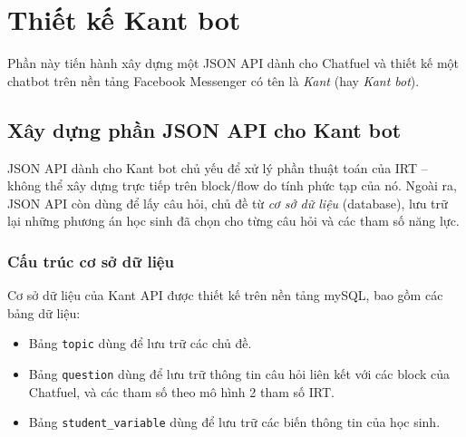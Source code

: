 \section{Thiết kế Kant bot}
Phần này tiến hành xây dựng một JSON API dành cho Chatfuel và thiết kế một chatbot trên nền tảng Facebook Messenger có tên là \textit{Kant} (hay \textit{Kant bot}).

\subsection{Xây dựng phần JSON API cho Kant bot}
JSON API dành cho Kant bot chủ yếu để xử lý phần thuật toán của IRT – không thể xây dựng trực tiếp trên block/flow do tính phức tạp của nó. Ngoài ra, JSON API còn dùng để lấy câu hỏi, chủ đề từ \textit{cơ sở dữ liệu} (database), lưu trữ lại những phương án học sinh đã chọn cho từng câu hỏi và các tham số năng lực.

\subsubsection{Cấu trúc cơ sở dữ liệu}
Cơ sở dữ liệu của Kant API được thiết kế trên nền tảng mySQL, bao gồm các bảng dữ liệu: \begin{itemize}
	\item Bảng \texttt{topic} dùng để lưu trữ các chủ đề.
	\item Bảng \texttt{question} dùng để lưu trữ thông tin câu hỏi liên kết với các block của Chatfuel, và các tham số theo mô hình 2 tham số IRT.
	\item Bảng \texttt{student\_variable} dùng để lưu trữ các biến thông tin của học sinh.
\end{itemize}

